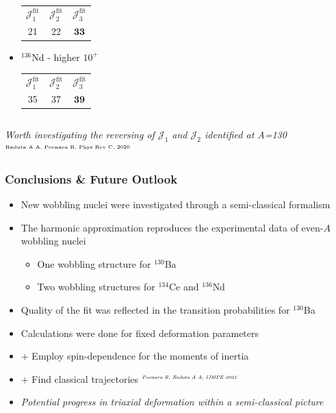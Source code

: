 \documentclass{beamer}
\begin{document}
\begin{frame}
\begin{columns}
\begin{column}{0.5\textwidth}
\begin{itemize}
        \begin{table}
          \centering
            \begin{tabular}{|c|c|c|}
              \hline
              $\mathcal{J}_1^\text{fit}$ & $\mathcal{J}_2^\text{fit}$ & $\mathcal{J}_3^\text{fit}$ \\ \cline{1-3}
              21                         & 22                         & $\mathbf{33}$          \\ \hline
            \end{tabular}
          \end{table}
        \item $^{136}$Nd - higher $10^+$
        \begin{table}
          \centering
            \begin{tabular}{|c|c|c|}
              \hline
              $\mathcal{J}_1^\text{fit}$ & $\mathcal{J}_2^\text{fit}$ & $\mathcal{J}_3^\text{fit}$  \\ \cline{1-3}
              35                         & 37                         & $\mathbf{39}$ \\ \hline
            \end{tabular}
          \end{table}
        \end{itemize}
    \end{column}
  \end{columns}
  \emph{Worth investigating the reversing of $\mathcal{J}_1$ and $\mathcal{J}_2$ identified at A=130} $^{\text{\tiny{Raduta A A, Poenaru R, Phys Rev C, 2020}}}$
\end{frame}

\begin{frame}
  \frametitle{Conclusions \& Future Outlook}
  \begin{itemize}
    \item New wobbling nuclei were investigated through a semi-classical formalism
    \item The harmonic approximation reproduces the experimental data of even-$A$ wobbling nuclei
    \begin{itemize}
      \item One wobbling structure for $^{130}$Ba
      \item Two wobbling structures for $^{134}$Ce and $^{136}$Nd 
    \end{itemize}
    \item Quality of the fit was reflected in the transition probabilities for $^{130}$Ba
    \item Calculations were done for fixed deformation parameters
    \item + Employ spin-dependence for the moments of inertia 
    \item + Find classical trajectories $^\text{\tiny\emph{Poenaru R, Raduta A A, IJMPE 2021}}$
    \item \emph{Potential progress in triaxial deformation within a semi-classical picture}
  \end{itemize}
\end{frame}
\end{document}
